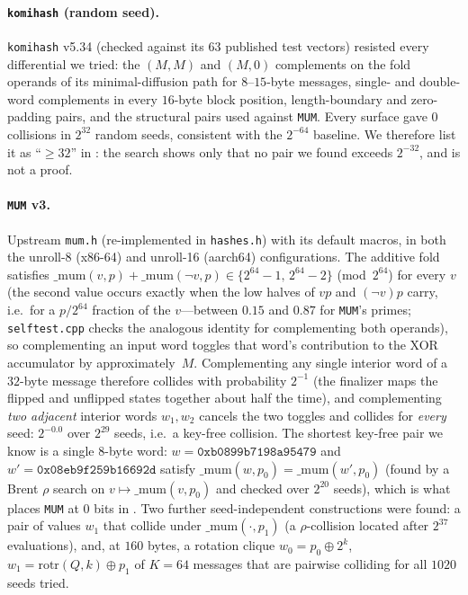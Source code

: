 \paragraph{\texttt{komihash} (random seed).}
\texttt{komihash} v5.34 (checked against its $63$ published test vectors)
resisted every differential we tried: the $(M,M)$ and $(M,0)$ complements on
the fold operands of its minimal-diffusion path for $8$--$15$-byte messages,
single- and double-word complements in every $16$-byte block position,
length-boundary and zero-padding pairs, and the structural pairs used against
\texttt{MUM}.  Every surface gave $0$ collisions in $2^{32}$ random seeds,
consistent with the $2^{-64}$ baseline.  We therefore list it as ``$\ge32$'' in
: the search shows only that no pair we found
exceeds $2^{-32}$, and is not a proof.

\paragraph{\texttt{MUM} v3.}
Upstream \texttt{mum.h} (re-implemented in \texttt{hashes.h}) with its default macros, in both the unroll-8 (x86-64) and
unroll-16 (aarch64) configurations.  The additive fold satisfies
$\_\mathrm{mum}(v,p)+\_\mathrm{mum}(\lnot v,p)\in\{2^{64}-1,\,2^{64}-2\}$ (mod~$2^{64}$)
for every $v$ (the second value occurs exactly when the low halves of $vp$ and
$(\lnot v)p$ carry, i.e.\ for a $p/2^{64}$ fraction of the $v$---between $0.15$
and $0.87$ for \texttt{MUM}'s primes; \texttt{selftest.cpp} checks the analogous
identity for complementing both operands), so complementing an input
word toggles that word's contribution to the XOR accumulator by
approximately~$M$.  Complementing any single interior word of a $32$-byte
message therefore collides with probability $2^{-1}$ (the finalizer maps the
flipped and unflipped states together about half the time), and complementing
\emph{two adjacent} interior words $w_1,w_2$ cancels the two toggles and
collides for \emph{every} seed: $2^{-0.0}$ over $2^{29}$ seeds, i.e.\ a
key-free collision.  The shortest key-free pair we know is a single $8$-byte
word: $w=\texttt{0xb0899b7198a95479}$ and $w'=\texttt{0x08eb9f259b16692d}$
satisfy $\_\mathrm{mum}(w,p_0)=\_\mathrm{mum}(w',p_0)$ (found by a Brent
$\rho$ search on $v\mapsto\_\mathrm{mum}(v,p_0)$ and checked over $2^{20}$
seeds), which is what places \texttt{MUM} at $0$ bits in
.  Two further seed-independent constructions were found: a
pair of values $w_1$ that collide under $\_\mathrm{mum}(\cdot,p_1)$ (a
$\rho$-collision located after $2^{37}$ evaluations), and, at $160$ bytes, a
rotation clique $w_0=p_0\oplus2^k$, $w_1=\mathrm{rotr}(Q,k)\oplus p_1$ of
$K=64$ messages that are pairwise colliding for all $1020$ seeds tried.

